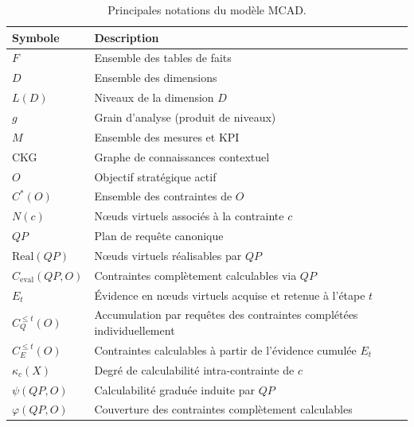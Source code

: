 \begin{table}[!t]
\centering
\caption{Principales notations du modèle MCAD.}
\scriptsize
\begin{tabularx}{\columnwidth}{@{}p{2.35cm}X@{}}
\toprule
Symbole & Description \\
\midrule
$F$ & Ensemble des tables de faits \\
$D$ & Ensemble des dimensions \\
$L(D)$ & Niveaux de la dimension $D$ \\
$g$ & Grain d'analyse (produit de niveaux) \\
$M$ & Ensemble des mesures et KPI \\
CKG & Graphe de connaissances contextuel \\
$O$ & Objectif stratégique actif \\
$C^*(O)$ & Ensemble des contraintes de $O$ \\
$N(c)$ & Nœuds virtuels associés à la contrainte $c$ \\
$QP$ & Plan de requête canonique \\
$\mathrm{Real}(QP)$ & Nœuds virtuels réalisables par $QP$ \\
$C_{\mathrm{eval}}(QP,O)$ & Contraintes complètement calculables via $QP$ \\
$E_t$ & Évidence en nœuds virtuels acquise et retenue à l'étape $t$ \\
$C_Q^{\le t}(O)$ & Accumulation par requêtes des contraintes complétées individuellement \\
$C_E^{\le t}(O)$ & Contraintes calculables à partir de l'évidence cumulée $E_t$ \\
$\kappa_c(X)$ & Degré de calculabilité intra-contrainte de $c$ \\
$\psi(QP,O)$ & Calculabilité graduée induite par $QP$ \\
$\varphi(QP,O)$ & Couverture des contraintes complètement calculables \\
\bottomrule
\end{tabularx}
\label{tab:notation}
\normalsize
\end{table}
